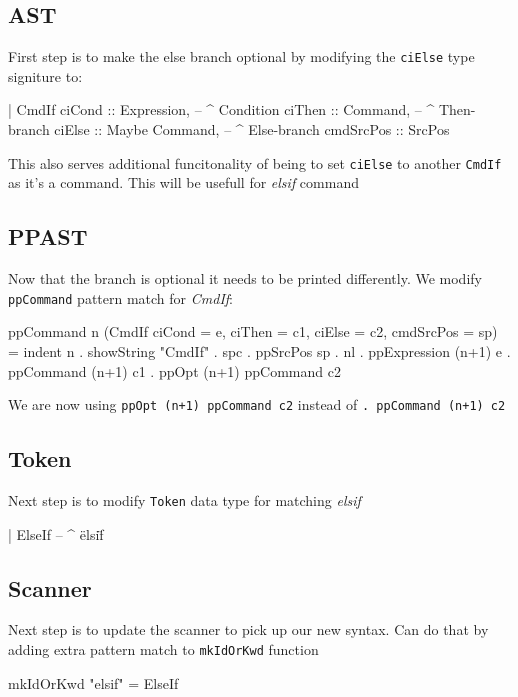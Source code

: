 \documentclass{article}
\begin{document}
\subsection{AST}
\begin{flushleft}
First step is to make the else branch optional by modifying the \texttt{ciElse} type signiture to:
\end{flushleft}
\begin{code}
| CmdIf {
      ciCond    :: Expression,      -- ^ Condition
      ciThen    :: Command,         -- ^ Then-branch
      ciElse    :: Maybe Command,   -- ^ Else-branch
      cmdSrcPos :: SrcPos
  }
\end{code}
\begin{flushleft}
This also serves additional funcitonality of being to set \texttt{ciElse} to another \texttt{CmdIf} as it's a command. This will be usefull for \textit{elsif} command
\end{flushleft}

\subsection{PPAST}
\begin{flushleft}
Now that the branch is optional it needs to be printed differently. We modify \texttt{ppCommand} pattern match for \textit{CmdIf}:
\end{flushleft}
\begin{code}
ppCommand n (CmdIf {ciCond = e, ciThen = c1, ciElse = c2, cmdSrcPos = sp}) =
    indent n . showString "CmdIf" . spc . ppSrcPos sp . nl
    . ppExpression (n+1) e
    . ppCommand (n+1) c1
    . ppOpt (n+1) ppCommand c2
\end{code}
\begin{flushleft}
We are now using \texttt{ppOpt (n+1) ppCommand c2} instead of \texttt{. ppCommand (n+1) c2}
\end{flushleft}

\subsection{Token}
\begin{flushleft}
Next step is to modify \texttt{Token} data type for matching \textit{elsif}
\end{flushleft}
\begin{code}
| ElseIf    -- ^ \"elsif\"
\end{code}

\subsection{Scanner}
\begin{flushleft}
Next step is to update the scanner to pick up our new syntax. Can do that by adding extra pattern match to \texttt{mkIdOrKwd} function
\end{flushleft}
\begin{code}
mkIdOrKwd "elsif"  = ElseIf
\end{code}
\end{document}
